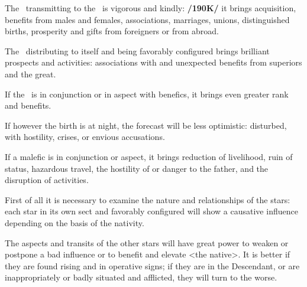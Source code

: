 The \Sun\, transmitting to the \Moon\, is vigorous and kindly: \textbf{/190K/} it brings acquisition, benefits from males and females, associations, marriages, unions, distinguished births, prosperity and gifts from foreigners or from abroad.

The \Sun\, distributing to itself and being favorably configured brings brilliant prospects and activities:
associations with and unexpected benefits from superiors and the great. 

If the \Sun\, is in conjunction or in aspect with benefics, it brings even greater rank and benefits. 

If however the birth is at night, the forecast will be less optimistic: disturbed, with hostility, crises, or envious accusations. 

If a malefic is in conjunction or aspect, it brings reduction of livelihood, ruin of status, hazardous travel, the hostility of or danger to the father, and the disruption of activities.

First of all it is necessary to examine the nature and relationships of the stars: each star in its own sect and favorably configured will show a causative influence depending on the basis of the nativity. 

The aspects and transits of the other stars will have great power to weaken or postpone a bad influence or to benefit and elevate <the native>. It is better if they are found rising and in operative signs; if they are in the Descendant, or are inappropriately or badly situated and afflicted, they will turn to the worse.

\newpage